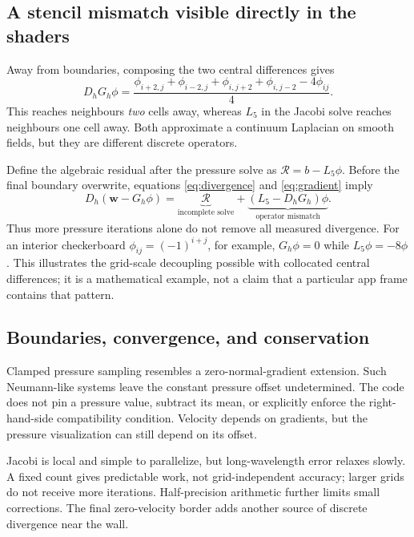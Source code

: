 \documentclass[11pt,a4paper]{article}
\begin{document}
\subsection*{A stencil mismatch visible directly in the shaders}
Away from boundaries, composing the two central differences gives
\begin{equation}
 D_hG_h\phi=
 \frac{\phi_{i+2,j}+\phi_{i-2,j}+\phi_{i,j+2}+\phi_{i,j-2}-4\phi_{ij}}{4}.
 \label{eq:composed}
\end{equation}
This reaches neighbours \emph{two} cells away, whereas $L_5$ in the Jacobi solve
reaches neighbours one cell away. Both approximate a continuum Laplacian on
smooth fields, but they are different discrete operators.

Define the algebraic residual after the pressure solve as
$\mathcal R=b-L_5\phi$. Before the final boundary overwrite, equations
\eqref{eq:divergence} and \eqref{eq:gradient} imply
\begin{equation}
 D_h(\mathbf w-G_h\phi)
 =\underbrace{\mathcal R}_{\text{incomplete solve}}
  +\underbrace{(L_5-D_hG_h)\phi}_{\text{operator mismatch}}.
 \label{eq:residual}
\end{equation}
Thus more pressure iterations alone do not remove all measured divergence.
For an interior checkerboard $\phi_{ij}=(-1)^{i+j}$, for example,
$G_h\phi=0$ while $L_5\phi=-8\phi$. This illustrates the grid-scale decoupling
possible with collocated central differences; it is a mathematical example,
not a claim that a particular app frame contains that pattern.

\subsection*{Boundaries, convergence, and conservation}
Clamped pressure sampling resembles a zero-normal-gradient extension. Such
Neumann-like systems leave the constant pressure offset undetermined. The code
does not pin a pressure value, subtract its mean, or explicitly enforce the
right-hand-side compatibility condition. Velocity depends on gradients, but the
pressure visualization can still depend on its offset.

Jacobi is local and simple to parallelize, but long-wavelength error relaxes
slowly. A fixed count gives predictable work, not grid-independent accuracy;
larger grids do not receive more iterations. Half-precision arithmetic further
limits small corrections. The final zero-velocity border adds another source of
discrete divergence near the wall.
\end{document}
